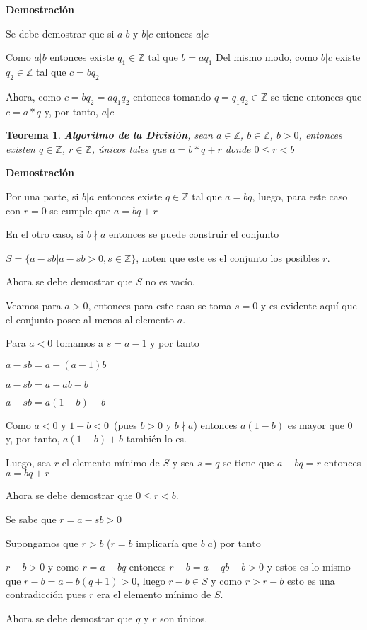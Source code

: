 \documentclass[a4paper,1pt]{report}
\newtheorem*{teo}{Teorema}
\begin{document}
\textbf{Demostración}

Se debe demostrar que si $a|b$ y $b|c$ entonces $a|c$

Como $a|b$ entonces existe $q_1\in\mathbb{Z}$ tal que $b=aq_1$
Del mismo modo, como $b|c$ existe $q_2\in\mathbb{Z}$ tal que $c=bq_2$

Ahora, como $c=bq_2=aq_1q_2$ entonces tomando $q=q_1q_2\in\mathbb{Z}$ se tiene entonces que $c=a*q$ y, por tanto, $a|c$ 

\begin{teo}
 \textbf{Algoritmo de la División}, sean $a\in\mathbb{Z}$, $b\in\mathbb{Z}$, $b > 0$, entonces existen $q\in\mathbb{Z}$, $r\in\mathbb{Z}$, únicos tales que $a = b*q+r$ donde $0\leq r < b$
\end{teo}

\textbf{Demostración}

Por una parte, si $b|a$ entonces existe $q\in\mathbb{Z}$ tal que $a=bq$, luego, para este caso con $r=0$ se cumple que $a=bq+r$

En el otro caso, si $b\nmid a$ entonces se puede construir el conjunto 

$S=\{a-sb|a-sb>0, s\in\mathbb{Z}\}$, noten que este es el conjunto los posibles $r$.

Ahora se debe demostrar que $S$ no es vacío.

Veamos para $a>0$, entonces para este caso se toma $s=0$ y es evidente aquí que el conjunto posee al menos al elemento $a$.

Para $a<0$ tomamos a $s=a-1$ y por tanto

$a-sb=a-(a-1)b$

$a-sb=a-ab-b$

$a-sb=a(1-b)+b$

Como $a<0$ y $1-b<0$~(pues $b>0$ y $b\nmid a$) entonces $a(1-b)$ es mayor que 0 y, por tanto, $a(1-b)+b$ también lo es.

Luego, sea $r$ el elemento mínimo de $S$ y sea $s=q$ se tiene que $a-bq=r$ entonces $a=bq+r$

Ahora se debe demostrar que $0\leq r < b$.

Se sabe que $r=a-sb>0$

Supongamos que $r>b$ ($r = b$ implicaría que $b|a$) por tanto

$r-b>0$ y como $r=a-bq$ entonces $r-b=a-qb-b>0$ y estos es lo mismo que $r-b=a-b(q+1)>0$, luego $r-b\in S$ y como $r>r-b$ esto es una contradicción pues $r$ era el elemento mínimo de $S$.

Ahora se debe demostrar que $q$ y $r$ son únicos.
\end{document}
